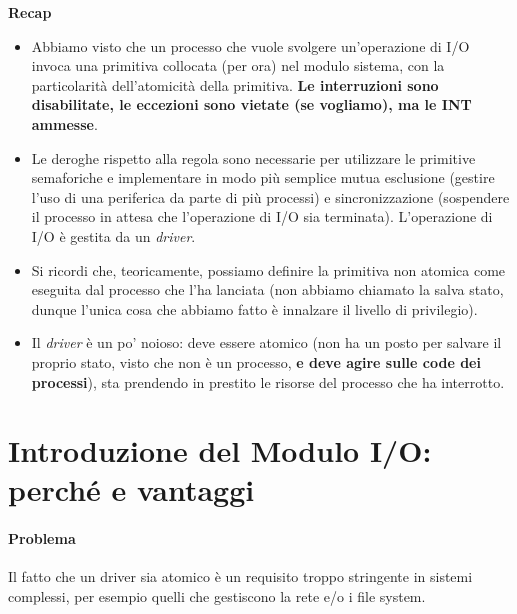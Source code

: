 \documentclass[11pt]{report}
\theoremstyle{definition}
\begin{document}
\begin{framed}
	\noindent \textbf{Recap} 
\begin{itemize}
	\item Abbiamo visto che un processo che vuole svolgere un'operazione di I/O invoca una primitiva collocata (per ora) nel modulo sistema, con la particolarità dell'atomicità della primitiva. \textbf{Le interruzioni sono disabilitate, le eccezioni sono vietate (se vogliamo), ma le INT ammesse}. 
	\item Le deroghe rispetto alla regola sono necessarie per utilizzare le primitive semaforiche e implementare in modo più semplice mutua esclusione (gestire l'uso di una periferica da parte di più processi) e sincronizzazione (sospendere il processo in attesa che l'operazione di I/O sia terminata). L'operazione di I/O è gestita da un \emph{driver}.
	\item Si ricordi che, teoricamente, possiamo definire la primitiva non atomica come eseguita dal processo che l'ha lanciata (non abbiamo chiamato la salva stato, dunque l'unica cosa che abbiamo fatto è innalzare il livello di privilegio). 
	\item 
	Il \emph{driver} è un po' noioso: deve essere atomico (non ha un posto per salvare il proprio stato, visto che non è un processo, \textbf{e deve agire sulle code dei processi}), sta prendendo in prestito le risorse del processo che ha interrotto.
\end{itemize}
\end{framed}

\clearpage

\section{Introduzione del Modulo I/O: perché e vantaggi}
\paragraph{Problema} Il fatto che un driver sia atomico è un requisito troppo stringente in sistemi complessi, per esempio quelli che gestiscono la rete e/o i file system. 
\end{document}

